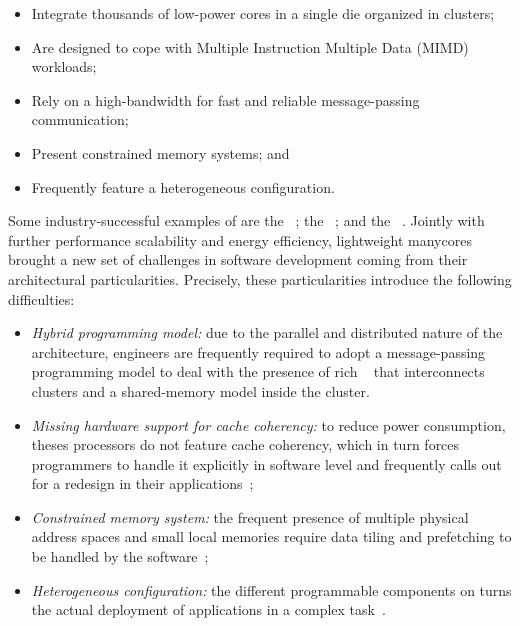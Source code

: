 	\begin{itemize}
		\item Integrate thousands of low-power cores in a single die organized in clusters;
		\item Are designed to cope with Multiple Instruction Multiple Data (MIMD) workloads;
		\item Rely on a high-bandwidth \noc for fast and reliable message-passing communication;
		\item Present constrained memory systems; and
		\item Frequently feature a heterogeneous configuration.
	\end{itemize}

	Some industry-successful examples of \lightweight \manycores are the
	\mppa~\cite{DeDinechin2013-1}; the \epiphany~\cite{olofsson2014};
	and the \taihulight~\cite{zheng2015}.  Jointly with further performance
	scalability and energy efficiency, lightweight manycores brought a new
	set of challenges in software development coming from their
	architectural particularities.  Precisely, these particularities
	introduce the following difficulties:
	\begin{itemize}
		\item \textit{Hybrid programming model:} due to the parallel and
		distributed nature of the architecture, engineers are frequently
		required to adopt a message-passing programming model to deal
		with the presence of rich \nocs~\cite{kelly2013} that
		interconnects clusters and a shared-memory model inside the
		cluster.

		\item \textit{Missing hardware support for cache coherency:} to
		reduce power consumption, theses processors do not feature cache
		coherency, which in turn forces programmers to handle it
		explicitly in software level and frequently calls out for a
		redesign in their applications~\cite{francesquini2015};

		\item \textit{Constrained memory system:} the frequent presence
		of multiple physical address spaces and small local memories
		require data tiling and prefetching to be handled by the
		software~\cite{Castro2016};

		\item \textit{Heterogeneous configuration:} the different
		programmable components on \lightweight \manycores turns the
		actual deployment of applications in a complex
		task~\cite{barbalace2015}.
	\end{itemize}

